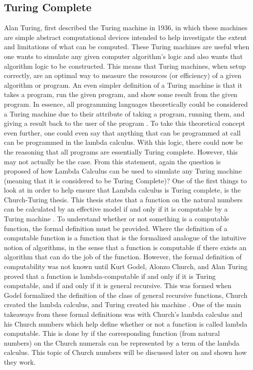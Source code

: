 \documentclass{article}
\begin{document}
\subsection{Turing Complete}
Alan Turing, first described the Turing machine in 1936, in which these machines are simple abstract computational devices intended to help investigate the extent and limitations of what can be computed.
These Turing machines are useful when one wants to simulate any given computer algorithm's logic and also wants that algorithm logic to be constructed.
This means that Turing machines, when setup correctly, are an optimal way to measure the resources (or efficiency) of a given algorithm or program.
An even simpler definition of a Turing machine is that it takes a program, run the given program, and show some result from the given program.
In essence, all programming languages theoretically could be considered a Turing machine due to their attribute of taking a program, running them, and giving a result back to the user of the program \cite{9}.
To take this theoretical concept even further, one could even say that anything that can be programmed at call can be programmed in the lambda calculus.
With this logic, there could now be the reasoning that all   programs are essentially Turing complete.
However, this may not actually be the case.
From this statement, again the question is proposed of how Lambda Calculus can be used to simulate any Turing machine (meaning that it is considered to be Turing Complete)?
One of the first things to look at in order to help ensure that Lambda calculus is Turing complete, is the Church-Turing thesis.
This thesis states that a function on the natural numbers can be calculated by an effective model if and only if it is computable by a Turing machine \cite{6}.
To understand whether or not something is a computable function, the formal definition must be provided.
Where the definition of a computable function is a function that is the formalized analogue of the intuitive notion of algorithms, in the sense that a function is computable if there exists an algorithm that can do the job of the function.
However, the formal definition of computability was not known until Kurt Godel, Alonzo Church, and Alan Turing proved that a function is lambda-computable if and only if it is Turing computable, and if and only if it is general recursive.
This was formed when Godel formalized the definition of the class of general recursive functions, Church created the lambda calculus, and Turing created his machine \cite{10}.
One of the main takeaways from  these formal definitions was with Church's lambda calculus and his Church numbers which help define whether or not a function is called lambda computable.
This is done by if the corresponding function (from natural numbers) on the Church numerals can be represented by a term of the lambda calculus. This topic of Church  numbers will be discussed later on and shown how they work.
\end{document}
